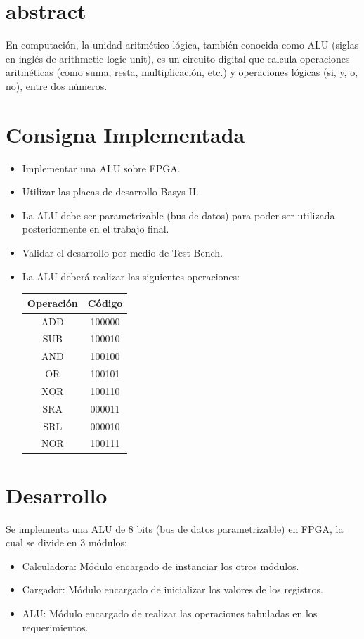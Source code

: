 \documentclass[letterpaper]{sae}
\begin{document}
\maketitle
\section{abstract}
En computación, la unidad aritmético lógica, también conocida como ALU (siglas en inglés de arithmetic logic unit), es un circuito digital que calcula operaciones aritméticas (como suma, resta, multiplicación, etc.) y operaciones lógicas (si, y, o, no), entre dos números.

\section{Consigna Implementada}
\begin{itemize}
	\item Implementar una ALU sobre FPGA.
	\item Utilizar las placas de desarrollo Basys II.
	\item La ALU debe ser parametrizable (bus de datos) para poder ser utilizada posteriormente en el trabajo final.
	\item Validar el desarrollo por medio de Test Bench.
	\item La ALU deberá realizar las siguientes operaciones:
	\begin{center}
	\begin{tabular}{|c|c|}
		\hline 
		Operación & Código\tabularnewline
		\hline 
		\hline 
		ADD & 100000\tabularnewline
		\hline 
		SUB & 100010\tabularnewline
		\hline 
		AND & 100100\tabularnewline
		\hline 
		OR & 100101\tabularnewline
		\hline 
		XOR & 100110\tabularnewline
		\hline 
		SRA & 000011\tabularnewline
		\hline 
		SRL & 000010\tabularnewline
		\hline 
		NOR & 100111\tabularnewline
		\hline 
	\end{tabular}
	\end{center}
\end{itemize}

\section{Desarrollo}
Se implementa una ALU de 8 bits (bus de datos parametrizable) en FPGA, la cual se divide en 3 módulos:

\begin{itemize}
	\item Calculadora: Módulo encargado de instanciar los otros módulos.
	\item Cargador: Módulo encargado de inicializar los valores de los registros.
	\item ALU: Módulo encargado de realizar las operaciones tabuladas en los requerimientos.
\end{itemize}
\end{document}
